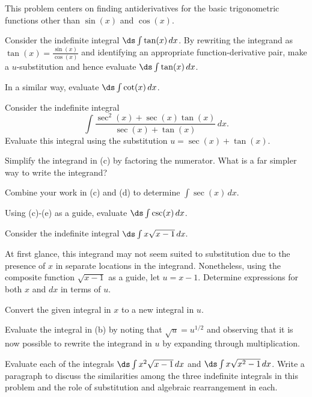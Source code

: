 \begin{exercises} 
  \item This problem centers on finding antiderivatives for the basic trigonometric functions other than $\sin(x)$ and $\cos(x)$.
  \ba
  	\item Consider the indefinite integral $\ds \int \tan(x) \, dx$.  By rewriting the integrand as $\tan(x) = \frac{\sin(x)}{\cos(x)}$ and identifying an appropriate function-derivative pair, make a $u$-substitution and hence evaluate $\ds \int \tan(x) \, dx$.
	\item In a similar way, evaluate $\ds \int \cot(x) \, dx$.
	\item Consider the indefinite integral 
	$$\int \frac{\sec^2(x) + \sec(x) \tan(x)}{\sec(x) + \tan(x)} \, dx.$$
	Evaluate this integral using the substitution $u = \sec(x) + \tan(x)$.
	\item Simplify the integrand in (c) by factoring the numerator.  What is a far simpler way to write the integrand?
	\item Combine your work in (c) and (d) to determine $\int \sec(x) \, dx$.
	\item Using (c)-(e) as a guide, evaluate $\ds \int \csc(x) \, dx$.
  \ea

  \item Consider the indefinite integral $\ds \int x \sqrt{x-1} \, dx.$
  \ba
  	\item At first glance, this integrand may not seem suited to substitution due to the presence of $x$ in separate locations in the integrand.  Nonetheless, using the composite function $\sqrt{x-1}$ as a guide, let $u = x-1$.  Determine expressions for both $x$ and $dx$ in terms of $u$.
	\item Convert the given integral in $x$ to a new integral in $u$.
	\item Evaluate the integral in (b) by noting that $\sqrt{u} = u^{1/2}$ and observing that it is now possible to rewrite the integrand in $u$ by expanding through multiplication.
	\item Evaluate each of the integrals $\ds \int x^2 \sqrt{x-1} \, dx$ and $\ds \int x \sqrt{x^2 - 1} \, dx$.  Write a paragraph to discuss the similarities among the three indefinite integrals in this problem and the role of substitution and algebraic rearrangement in each.
  \ea


\end{exercises}
